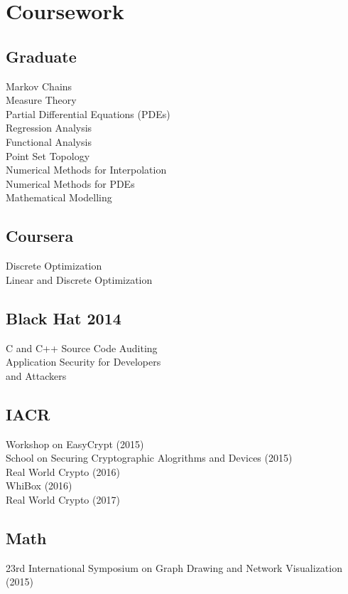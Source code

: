 \documentclass[letterpaper]{clinton-resume}
\begin{document}
\begin{minipage}[t]{0.33\textwidth}
\section{Coursework}

\subsection{Graduate}
Markov Chains\\
Measure Theory\\
Partial Differential Equations (PDEs)\\
Regression Analysis\\
Functional Analysis\\
Point Set Topology\\
Numerical Methods for Interpolation\\
Numerical Methods for PDEs\\
Mathematical Modelling\\
\subsection{Coursera}
Discrete Optimization\\
Linear and Discrete Optimization\\
\subsection{Black Hat 2014}
C and C++ Source Code Auditing\\
Application Security for Developers\\and Attackers\\
\subsection{IACR}
Workshop on EasyCrypt (2015)\\
School on Securing Cryptographic Alogrithms and Devices (2015)\\
Real World Crypto (2016)\\
WhiBox (2016)\\
Real World Crypto (2017)\\
\subsection{Math}
23rd International Symposium on Graph Drawing and Network Visualization (2015)\\
\end{minipage}
\end{document}
